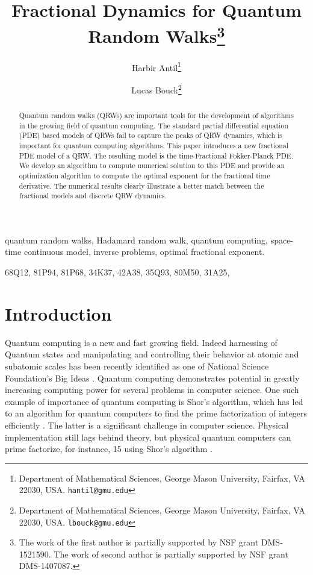 \documentclass{siamart1116}
\title{Fractional Dynamics for Quantum Random Walks\thanks{The work of the first author is partially supported by NSF grant DMS-1521590. The work of second author is partially supported by NSF grant DMS-1407087.}}
\author{Harbir Antil\thanks{Department of Mathematical Sciences, George Mason University, Fairfax, VA 22030, USA. \texttt{hantil@gmu.edu}}
\and 
Lucas Bouck\thanks{Department of Mathematical Sciences, George Mason University, Fairfax, VA 22030, USA. \texttt{lbouck@gmu.edu}}
}
\begin{document}
\maketitle

\begin{abstract}
Quantum random walks (QRWs) are important tools for the development of algorithms in the growing field of quantum computing. The standard partial differential equation (PDE) based models of QRWs fail to capture the peaks of QRW dynamics, which is important for quantum computing algorithms. This paper introduces a new fractional PDE model of a QRW. The resulting model is the time-Fractional 
Fokker-Planck PDE. We develop an algorithm to compute numerical solution to this PDE and provide an optimization algorithm to compute the optimal exponent for the fractional time derivative. The numerical results clearly illustrate a better match between the fractional models and discrete QRW dynamics. 
\end{abstract}


\begin{keywords}
quantum random walks, Hadamard random walk, quantum computing, space-time continuous model, 
 inverse problems, optimal fractional exponent.
\end{keywords}

\begin{AMS}
68Q12,  %
 81P94,  %
 81P68,  %
 34K37, 	 %
 42A38,  %
 35Q93,  %
 80M50,  %
 31A25,  %
\end{AMS}


\section{Introduction}\label{s:intro}

Quantum computing is a new and fast growing field. Indeed harnessing of Quantum states 
and manipulating and controlling their behavior at atomic and subatomic scales has been
recently identified as one of National Science Foundation's Big Ideas \cite{NSF_quantum_2018}.
Quantum computing demonstrates potential in greatly increasing computing power for several
problems in computer science. One such example of importance of quantum computing is Shor's 
algorithm, which has led to an algorithm for quantum computers to find the prime factorization of 
integers efficiently \cite{shor}. The latter is a significant challenge in computer science. Physical implementation still lags behind theory, but physical quantum computers can prime factorize,
for instance, 15 using Shor's algorithm \cite{Vandersypen_2001}.
\end{document}
